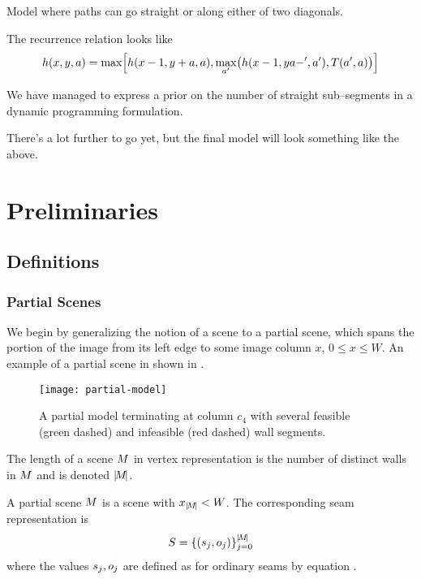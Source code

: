 Model where paths can go straight or along either of two diagonals.

The recurrence relation looks like
\begin{equation}
  h(x,y,a) = \max \Bigl[ h(x-1,y+a,a), 
    \max_{a'}\limits \bigl( h(x-1, ya-', a'), T(a',a) \bigr) \Bigl]
\end{equation}

We have managed to express a prior on the number of straight
sub--segments in a dynamic programming formulation.

There's a lot further to go yet, but the final model will look
something like the above.

\section{Preliminaries}
\label{sect:preliminaries}

\subsection{Definitions}

\subsubsection{Partial Scenes}

We begin by generalizing the notion of a scene to a partial scene,
which spans the portion of the image from its left edge to some image
column $x$, $0 \leq x \leq W$. An example of a partial scene in shown
in .

\begin{figure}[tb]
  \centering
  \label{fig:partial-scene}
  \texttt{[image: partial-model]}
  \caption{A partial model terminating at column $c_4$ with several
    feasible (green dashed) and infeasible (red dashed) wall
    segments.}
\end{figure}

\begin{definition}
  \label{def:scene-len}
  The length of a scene $\Scene$ in vertex representation
   is the number of distinct walls in $\Scene$ and
  is denoted $\Length{\Scene}$.
\end{definition}

\begin{definition}
  \label{def:partial-scene}
  A partial scene $\PartialScene$ is a scene with
  $x_{\Length{\Scene}}<\Width$. The corresponding seam representation
  is
  \begin{equation}
    \PartialSeam = \{(\seam_j,\WallOrient_j)\}_{j=0}^{\Length{\PartialScene}}
  \end{equation}
  where the values $\seam_j,\WallOrient_j$ are defined as for ordinary
  seams by equation .
\end{definition}

